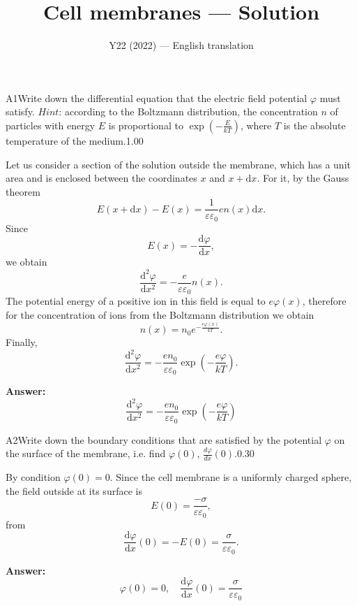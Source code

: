 \documentclass[11pt,a4paper]{article}
\title{\textbf{Cell membranes --- Solution}}
\author{\normalsize Y22 (2022) — English translation}
\date{}
\begin{document}
\maketitle\vspace{-0.5em}
\begin{solcard}{A1}{Write down the differential equation that the electric field potential $\varphi$ must satisfy. $\textit{Hint:}$ according to the Boltzmann distribution, the concentration $n$ of particles with energy $E$ is proportional to $\exp\left(-\frac E{kT}\right)$, where $T$ is the absolute temperature of the medium.}{1.00}

Let us consider a section of the solution outside the membrane, which has a unit area and is enclosed between the coordinates $x$ and $x+\mathrm dx$. For it, by the Gauss theorem\[E(x+\mathrm dx)-E(x)=\frac1{\varepsilon\varepsilon_0}en(x)\mathrm dx.\]Since\[E(x)=-\frac{\mathrm d\varphi}{\mathrm dx},\]we obtain\[\frac{\mathrm d^2\varphi}{\mathrm dx^2}=-\frac e{\varepsilon\varepsilon_0}n(x).\]The potential energy of a positive ion in this field is equal to $e\varphi(x)$, therefore for the concentration of ions from the Boltzmann distribution we obtain\[n(x)=n_0e^{-\frac{e\varphi(x)}{kT}}.\] Finally,\[\frac{\mathrm d^2\varphi}{\mathrm dx^2}=-\frac{en_0}{\varepsilon\varepsilon_0}\exp\left(-\frac{e\varphi}{kT}\right).\]

\par\smallskip\noindent\textbf{Answer:} \[\frac{\mathrm d^2\varphi}{\mathrm dx^2}=-\frac{en_0}{\varepsilon\varepsilon_0}\exp\left(-\frac{e\varphi}{kT}\right)\]
\end{solcard}

\begin{solcard}{A2}{Write down the boundary conditions that are satisfied by the potential $\varphi$ on the surface of the membrane, i.e. find $\varphi(0)$, $\displaystyle\frac{d\varphi}{dx}(0)$.}{0.30}

By condition $\varphi(0)=0$. Since the cell membrane is a uniformly charged sphere, the field outside at its surface is \[E(0)=\frac{-\sigma}{\varepsilon\varepsilon_0},\]from\[\frac{\mathrm d\varphi}{\mathrm dx}(0)=-E(0)=\frac\sigma{\varepsilon\varepsilon_0}.\]

\par\smallskip\noindent\textbf{Answer:} \[\varphi(0)=0,\quad\frac{\mathrm d\varphi}{\mathrm dx}(0)=\frac\sigma{\varepsilon\varepsilon_0}\]
\end{solcard}
\end{document}
